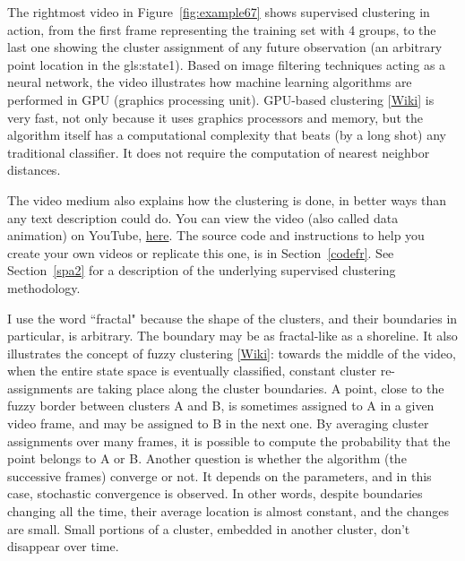 \documentclass[10pt]{article}
\begin{document}
The rightmost video in Figure~\ref{fig:example67} shows \textcolor{index}{supervised clustering} in action, from the first frame representing the 
\textcolor{index}{training set} with 4 groups, to the last one showing the cluster assignment of any future observation (an arbitrary point location 
in the \gls{gls:state1}). Based on \textcolor{index}{image filtering} techniques acting as a \textcolor{index}{neural network}, the video illustrates how machine learning algorithms are performed in GPU (graphics processing unit). 
\textcolor{index}{GPU-based clustering} [\href{https://en.wikipedia.org/wiki/General-purpose_computing_on_graphics_processing_units}{Wiki}] is very fast, not only because it uses graphics processors and memory, but the algorithm itself has a computational complexity that beats (by a long shot) any traditional classifier. It does not require the computation of \textcolor{index}{nearest neighbor distances}.

The video medium also explains how the clustering is done, in better ways than any text description could do. You can view the video (also called 
\textcolor{index}{data animation})
on YouTube, \href{https://www.youtube.com/watch?v=dNPSEh-X6uw}{here}. The source code and instructions to help you create your own
videos or replicate this one, is in Section~\ref{codefr}. See Section~\ref{spa2} for a description of the underlying supervised clustering methodology.

I use the word ``fractal" because the shape of the clusters, and their boundaries in particular, is arbitrary. The boundary may be as fractal-like as a shoreline. It also illustrates the concept of
\textcolor{index}{fuzzy clustering} [\href{https://en.wikipedia.org/wiki/Fuzzy_clustering}{Wiki}]: towards the middle of the video, when the entire state space is eventually classified, constant 
cluster re-assignments are taking place along the cluster boundaries. A point, close to the fuzzy border between clusters A and B, is sometimes assigned to A in a given video frame, and may be assigned to B in the next one. By averaging cluster assignments over many frames, it is possible to compute the probability that the point belongs to A or B. Another question is whether 
the algorithm (the successive frames) converge or not. It depends on the parameters, and in this case, 
\textcolor{index}{stochastic convergence} is observed. In other words, despite boundaries changing all the time, their average location is almost constant,
and the changes are small. Small portions of a cluster, embedded in another cluster, don't disappear over time. \\
\quad \\
\end{document}
